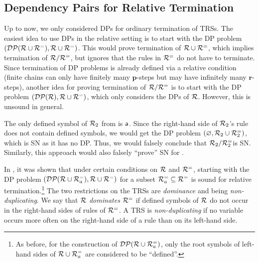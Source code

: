 \subsection{Dependency Pairs for Relative Termination}\label{Dependency Pairs for Relative Termination}

Up to now, we only considered DPs for ordinary termination of TRSs.
The easiest idea to use DPs in the relative setting is to start with the DP problem 
$(\mathcal{DP}(\mathcal{R} \cup \mathcal{R}^{=}), \mathcal{R} \cup \mathcal{R}^{=})$.
This would prove termination of $\mathcal{R} \cup \mathcal{R}^{=}$, which implies termination of $\mathcal{R} / \mathcal{R}^{=}$, but
ignores that the rules in $\mathcal{R}^{=}$ do not have to terminate.
Since termination of DP problems is already defined via a relative condition (finite chains
can only have finitely
many $\mathbf{p}$-steps but may have
infinitely many $\mathbf{r}$-steps),
another idea 
for proving termination of $\mathcal{R} / \mathcal{R}^{=}$ is to start
with the DP problem $(\mathcal{DP}(\mathcal{R}), \mathcal{R} \cup \mathcal{R}^{=})$, which only considers
the DPs of $\mathcal{R}$.
However,  this is unsound in general.

\begin{example}\label{ex:dps-dont-work-in-relative}
     The only defined symbol of $\mathcal{R}_2$  from  is $\mathsf{a}$.
     Since the right-hand side of $\mathcal{R}_2$'s rule does not contain 
  defined symbols, we would get the DP problem
  $(\emptyset,\linebreak \R_2 \cup \R_2^{=})$, which is SN as it has no
  DP.
    Thus, we would falsely conclude that $\mathcal{R}_2 / \mathcal{R}_2^{=}$\linebreak is SN.
Similarly, 
this approach would also falsely ``prove'' SN for
.
\end{example}

In \cite{iborra2017relative}, it was shown that under
certain conditions on $\mathcal{R}$ and $\mathcal{R}^{=}$, starting with the DP problem $(\mathcal{DP}(\mathcal{R} \cup \mathcal{R}_a^{=}),
\mathcal{R} \cup \mathcal{R}^{=})$ for a subset $\mathcal{R}_a^{=} \subseteq \mathcal{R}^{=}$
is sound
for relative termination.\footnote{As before,
for the construction of $\mathcal{DP}(\mathcal{R}
  \cup \mathcal{R}_a^{=})$,  only the root symbols of left-hand sides of $\mathcal{R}
\cup \mathcal{R}_a^{=}$
are considered to be ``defined''.}
The two restrictions on the TRSs are \emph{dominance} and being \emph{non-duplicating}.
We say that $\mathcal{R}$ \emph{dominates} $\mathcal{R}^{=}$ if defined symbols of $\mathcal{R}$
do not occur in
the right-hand sides of rules of $\mathcal{R}^{=}$.
A TRS is \emph{non-duplicating} if no variable occurs more often
on the right-hand side of a rule than on its left-hand side.

